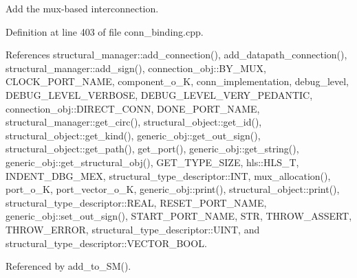 Add the mux-\/based interconnection. 



Definition at line 403 of file conn\+\_\+binding.\+cpp.



References structural\+\_\+manager\+::add\+\_\+connection(), add\+\_\+datapath\+\_\+connection(), structural\+\_\+manager\+::add\+\_\+sign(), connection\+\_\+obj\+::\+B\+Y\+\_\+\+M\+UX, C\+L\+O\+C\+K\+\_\+\+P\+O\+R\+T\+\_\+\+N\+A\+ME, component\+\_\+o\+\_\+K, conn\+\_\+implementation, debug\+\_\+level, D\+E\+B\+U\+G\+\_\+\+L\+E\+V\+E\+L\+\_\+\+V\+E\+R\+B\+O\+SE, D\+E\+B\+U\+G\+\_\+\+L\+E\+V\+E\+L\+\_\+\+V\+E\+R\+Y\+\_\+\+P\+E\+D\+A\+N\+T\+IC, connection\+\_\+obj\+::\+D\+I\+R\+E\+C\+T\+\_\+\+C\+O\+NN, D\+O\+N\+E\+\_\+\+P\+O\+R\+T\+\_\+\+N\+A\+ME, structural\+\_\+manager\+::get\+\_\+circ(), structural\+\_\+object\+::get\+\_\+id(), structural\+\_\+object\+::get\+\_\+kind(), generic\+\_\+obj\+::get\+\_\+out\+\_\+sign(), structural\+\_\+object\+::get\+\_\+path(), get\+\_\+port(), generic\+\_\+obj\+::get\+\_\+string(), generic\+\_\+obj\+::get\+\_\+structural\+\_\+obj(), G\+E\+T\+\_\+\+T\+Y\+P\+E\+\_\+\+S\+I\+ZE, hls\+::\+H\+L\+S\+\_\+T, I\+N\+D\+E\+N\+T\+\_\+\+D\+B\+G\+\_\+\+M\+EX, structural\+\_\+type\+\_\+descriptor\+::\+I\+NT, mux\+\_\+allocation(), port\+\_\+o\+\_\+K, port\+\_\+vector\+\_\+o\+\_\+K, generic\+\_\+obj\+::print(), structural\+\_\+object\+::print(), structural\+\_\+type\+\_\+descriptor\+::\+R\+E\+AL, R\+E\+S\+E\+T\+\_\+\+P\+O\+R\+T\+\_\+\+N\+A\+ME, generic\+\_\+obj\+::set\+\_\+out\+\_\+sign(), S\+T\+A\+R\+T\+\_\+\+P\+O\+R\+T\+\_\+\+N\+A\+ME, S\+TR, T\+H\+R\+O\+W\+\_\+\+A\+S\+S\+E\+RT, T\+H\+R\+O\+W\+\_\+\+E\+R\+R\+OR, structural\+\_\+type\+\_\+descriptor\+::\+U\+I\+NT, and structural\+\_\+type\+\_\+descriptor\+::\+V\+E\+C\+T\+O\+R\+\_\+\+B\+O\+OL.



Referenced by add\+\_\+to\+\_\+\+S\+M().


